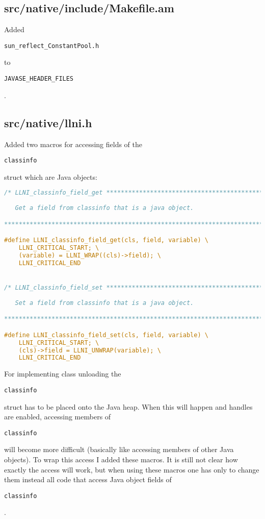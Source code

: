 \documentclass[a4paper, 10pt, titlepage]{scrartcl} %
\begin{document}
\subsection{src/native/include/Makefile.am}
\label{sec:src/native/include/Makefile.am}

Added \begin{scriptsize}\verb|sun_reflect_ConstantPool|\hspace{0.0pt}\verb|.|\hspace{0.0pt}\verb|h|\end{scriptsize} to \begin{scriptsize}\verb|JAVASE_HEADER_FILES|\end{scriptsize}.

\subsection{src/native/llni.h}
\label{sec:src/native/llni.h}

Added two macros for accessing fields of the \begin{scriptsize}\verb|classinfo|\end{scriptsize} struct which are Java
objects:
\begin{lstlisting}[language=C,firstnumber=88]
/* LLNI_classinfo_field_get ***************************************************
 
   Get a field from classinfo that is a java object.

******************************************************************************/

#define LLNI_classinfo_field_get(cls, field, variable) \
	LLNI_CRITICAL_START; \
	(variable) = LLNI_WRAP((cls)->field); \
	LLNI_CRITICAL_END


/* LLNI_classinfo_field_set ***************************************************
 
   Set a field from classinfo that is a java object.

******************************************************************************/

#define LLNI_classinfo_field_set(cls, field, variable) \
	LLNI_CRITICAL_START; \
	(cls)->field = LLNI_UNWRAP(variable); \
	LLNI_CRITICAL_END
\end{lstlisting}

For implementing class unloading the \begin{scriptsize}\verb|classinfo|\end{scriptsize} struct has to be placed onto the
Java heap. When this will happen and handles are enabled, accessing members of
\begin{scriptsize}\verb|classinfo|\end{scriptsize} will become more difficult (basically like accessing members of other
Java objects). To wrap this access I added these macros. It is still not clear
how exactly the access will work, but when using these macros one has only to
change them instead all code that access Java object fields of \begin{scriptsize}\verb|classinfo|\end{scriptsize}.
\end{document}
